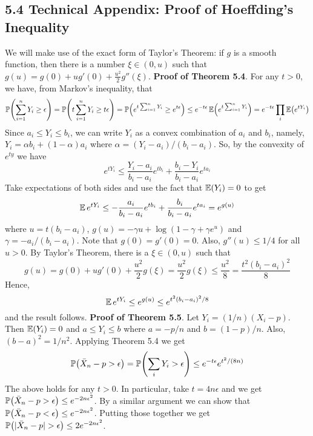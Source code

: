 \subsection*{5.4 Technical Appendix: Proof of Hoeffding's Inequality}\label{technical:appendix:hoeffdings}
We will make use of the exact form of Taylor's Theorem: if \(g\) is a
smooth function, then there is a number \(\xi \in (0, u)\) such that
\(g(u) = g(0) + u g'(0) + \frac{u^{2}}{2}g''(\xi)\).
\textbf{Proof of Theorem 5.4}. For any \(t > 0\), we have, from Markov's
inequality, that
\[
\PROB\left( \sum_{i=1}^{n} Y_{i} \geq \epsilon \right) = \PROB\left( t \sum_{i=1}^{n} Y_{i} \geq t \epsilon \right)
= \PROB\left( e^{t \sum_{i=1}^{n} Y_{i}} \geq e^{t \epsilon} \right) \leq e^{-t\epsilon} \EXP\left( e^{t \sum_{i=1}^{n} Y_{i}}\right) = e^{-t\epsilon} \prod_{i} \EXP\left(e^{tY_{i}}\right)
\]
Since \(a_{i} \leq Y_{i} \leq b_{i}\), we can write \(Y_{i}\) as a convex
combination of \(a_{i}\) and \(b_{i}\), namely,
\(Y_{i} = \alpha b_{i} + (1 - \alpha) a_{i}\) where
\(\alpha = (Y_{i} - a_{i}) / (b_{i} - a_{i})\). So, by the convexity of
\(e^{ty}\) we have
\[
e^{tY_{i}} \leq \frac{Y_{i} - a_{i}}{b_{i} - a_{i}} e^{tb_{i}} + \frac{b_{i} - Y_{i}}{b_{i} - a_{i}} e^{ta_{i}}
\]
Take expectations of both sides and use the fact that
\(\operatorname{\mathbb{E}}(Y_{i}) = 0\) to get
\[
\operatorname{\mathbb{E}} e^{tY_{i}} \leq - \frac{a_{i}}{b_{i} - a_{i}} e^{tb_{i}} + \frac{b_{i}}{b_{i} - a_{i}} e^{ta_{i}} = e^{g(u)}
\]
where \(u = t(b_{i} - a_{i})\),
\(g(u) = -\gamma u + \log (1 - \gamma + \gamma e^u)\) and
\(\gamma = -a_{i} / (b_{i} - a_{i})\).
Note that \(g(0) = g'(0) = 0\). Also, \(g''(u) \leq 1/4\) for all
\(u > 0\). By Taylor's Theorem, there is a \(\xi \in (0, u)\) such that
\[
g(u) = g(0) + u g'(0) + \frac{u^{2}}{2} g(\xi) = \frac{u^{2}}{2} g(\xi) \leq \frac{u^{2}}{8} = \frac{t^{2}(b_{i} - a_{i})^{2}}{8}
\]
Hence,
\[
\operatorname{\mathbb{E}} e^{tY_{i}} \leq e^{g(u)} \leq e^{t^{2}(b_{i} - a_{i})^{2}/8}
\]
and the result follows.
\textbf{Proof of Theorem 5.5}. Let \(Y_{i} = (1 / n)(X_{i} - p)\). Then
\(\operatorname{\mathbb{E}}(Y_{i}) = 0\) and \(a \leq Y_{i} \leq b\) where \(a = -p/n\) and
\(b = (1 - p) / n\). Also, \((b - a)^{2} = 1/n^{2}\). Applying Theorem 5.4
we get
\[
\PROB\left(\bar{X}_{n} - p > \epsilon\right) = \PROB\left( \sum_{i} Y_{i} > \epsilon \right) \leq e^{-t\epsilon} e^{t^{2}/(8n)}
\]
The above holds for any \(t > 0\). In particular, take
\(t = 4n\epsilon\) and we get
\(\PROB\left(\bar{X}_{n} - p > \epsilon\right)  \leq e^{-2n\epsilon^{2}}\).
By a similar argument we can show that
\(\PROB\left(\bar{X}_{n} - p < \epsilon\right)  \leq e^{-2n\epsilon^{2}}\).
Putting those together we get
\(\PROB\left(|\bar{X}_{n} - p| >  \epsilon\right)  \leq 2e^{-2n\epsilon^{2}}\).


